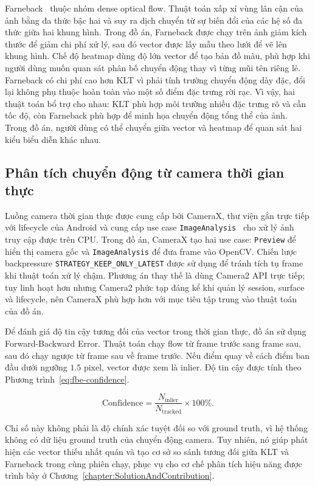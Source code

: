 \documentclass[../DoAn.tex]{subfiles}
\begin{document}
Farneback~\cite{farneback2003} thuộc nhóm dense optical flow. Thuật toán xấp xỉ vùng lân cận của ảnh bằng đa thức bậc hai và suy ra dịch chuyển từ sự biến đổi của các hệ số đa thức giữa hai khung hình. Trong đồ án, Farneback được chạy trên ảnh giảm kích thước để giảm chi phí xử lý, sau đó vector được lấy mẫu theo lưới để vẽ lên khung hình. Chế độ heatmap dùng độ lớn vector để tạo bản đồ màu, phù hợp khi người dùng muốn quan sát phân bố chuyển động thay vì từng mũi tên riêng lẻ. Farneback có chi phí cao hơn KLT vì phải tính trường chuyển động dày đặc, đổi lại không phụ thuộc hoàn toàn vào một số điểm đặc trưng rời rạc. Vì vậy, hai thuật toán bổ trợ cho nhau: KLT phù hợp môi trường nhiều đặc trưng rõ và cần tốc độ, còn Farneback phù hợp để minh họa chuyển động tổng thể của ảnh. Trong đồ án, người dùng có thể chuyển giữa vector và heatmap để quan sát hai kiểu biểu diễn khác nhau.

\subsection{Phân tích chuyển động từ camera thời gian thực}
\label{subsection:3.4.4}
Luồng camera thời gian thực được cung cấp bởi CameraX, thư viện gắn trực tiếp với lifecycle của Android và cung cấp use case \texttt{ImageAnalysis}~\cite{android-camerax-imageanalysis} cho xử lý ảnh truy cập được trên CPU. Trong đồ án, CameraX tạo hai use case: \texttt{Preview} để hiển thị camera gốc và \texttt{ImageAnalysis} để đưa frame vào OpenCV. Chiến lược backpressure \texttt{STRATEGY\_KEEP\_ONLY\_LATEST} được sử dụng để tránh tích tụ frame khi thuật toán xử lý chậm. Phương án thay thế là dùng Camera2 API trực tiếp; tuy linh hoạt hơn nhưng Camera2 phức tạp đáng kể khi quản lý session, surface và lifecycle, nên CameraX phù hợp hơn với mục tiêu tập trung vào thuật toán của đồ án.

Để đánh giá độ tin cậy tương đối của vector trong thời gian thực, đồ án sử dụng Forward-Backward Error. Thuật toán chạy flow từ frame trước sang frame sau, sau đó chạy ngược từ frame sau về frame trước. Nếu điểm quay về cách điểm ban đầu dưới ngưỡng $1.5$ pixel, vector được xem là inlier. Độ tin cậy được tính theo Phương trình~\ref{eq:fbe-confidence}.

\begin{equation}
\label{eq:fbe-confidence}
\text{Confidence} = \frac{N_{\text{inlier}}}{N_{\text{tracked}}} \times 100\%.
\end{equation}

Chỉ số này không phải là độ chính xác tuyệt đối so với ground truth, vì hệ thống không có dữ liệu ground truth của chuyển động camera. Tuy nhiên, nó giúp phát hiện các vector thiếu nhất quán và tạo cơ sở so sánh tương đối giữa KLT và Farneback trong cùng phiên chạy, phục vụ cho cơ chế phân tích hiệu năng được trình bày ở Chương~\ref{chapter:SolutionAndContribution}.
\end{document}
